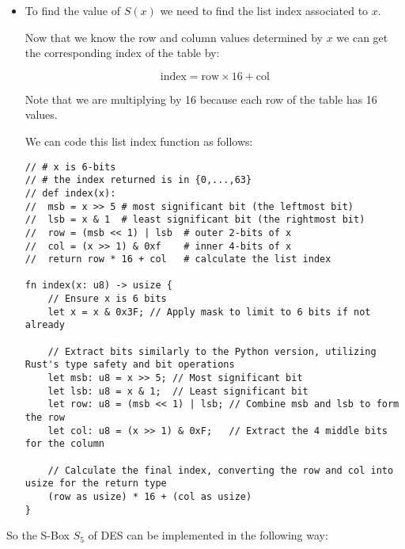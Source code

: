 \newpage
\begin{itemize}
	\item To find the value of $S(x)$ we need to find the list index associated to $x$.
	
	Now that we know the row and column values determined by $x$ we can get the corresponding index of the table by:
	
	\[ \text{index} = \text{row} \times 16 + \text{col} \]
	
	Note that we are multiplying by 16 because each row of the table has 16 values.
	
	We can code this list index function as follows:
	
\begin{lstlisting}[style=C]
// # x is 6-bits
// # the index returned is in {0,...,63}
// def index(x):
//	msb = x >> 5 # most significant bit (the leftmost bit)
//	lsb = x & 1  # least significant bit (the rightmost bit)
//	row = (msb << 1) | lsb  # outer 2-bits of x
//	col = (x >> 1) & 0xf    # inner 4-bits of x
//	return row * 16 + col   # calculate the list index
	
fn index(x: u8) -> usize {
	// Ensure x is 6 bits
	let x = x & 0x3F; // Apply mask to limit to 6 bits if not already
	
	// Extract bits similarly to the Python version, utilizing Rust's type safety and bit operations
	let msb: u8 = x >> 5; // Most significant bit
	let lsb: u8 = x & 1;  // Least significant bit
	let row: u8 = (msb << 1) | lsb; // Combine msb and lsb to form the row
	let col: u8 = (x >> 1) & 0xF;   // Extract the 4 middle bits for the column
	
	// Calculate the final index, converting the row and col into usize for the return type
	(row as usize) * 16 + (col as usize)
}
\end{lstlisting}
\end{itemize}

\newpage
So the S-Box \(S_5\) of DES can be implemented in the following way:

